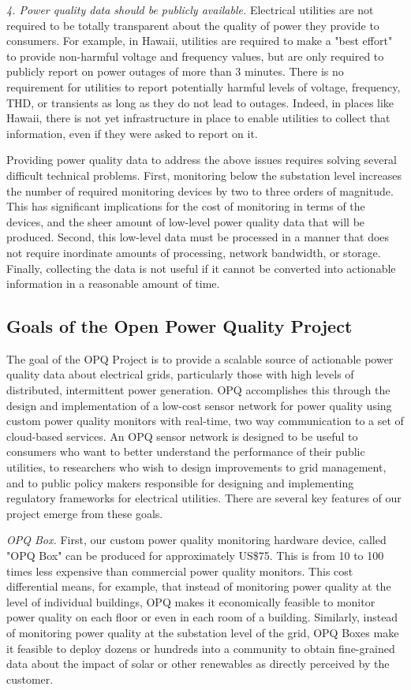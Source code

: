 {\em 4. Power quality data should be publicly available.} Electrical utilities are not required to be totally transparent about the quality of power they provide to consumers. For example, in Hawaii, utilities are required to make a "best effort" to provide non-harmful voltage and frequency values, but are only required to publicly report on power outages of more than 3 minutes. There is no requirement for utilities to report potentially harmful levels of voltage, frequency, THD, or transients as long as they do not lead to outages. Indeed, in places like Hawaii, there is not yet infrastructure in place to enable utilities to collect that information, even if they were asked to report on it.

Providing power quality data to address the above issues requires solving several difficult technical problems. First, monitoring below the substation level increases the number of required monitoring devices by two to three orders of magnitude. This has significant implications for the cost of monitoring in terms of the devices, and the sheer amount of low-level power quality data that will be produced. Second, this low-level data must be processed in a manner that does not require inordinate amounts of processing, network bandwidth, or storage. Finally, collecting the data is not useful if it cannot be converted into actionable information in a reasonable amount of time.

\subsection{Goals of the Open Power Quality Project}

The goal of the OPQ Project is to provide a scalable source of actionable power quality data about electrical grids, particularly those with high levels of distributed, intermittent power generation. OPQ accomplishes this through the design and implementation of a low-cost sensor network for power quality using custom power quality monitors with real-time, two way communication to a set of cloud-based services. An OPQ sensor network is designed to be useful to consumers who want to better understand the performance of their public utilities, to researchers who wish to design improvements to grid management, and to public policy makers responsible for designing and implementing regulatory frameworks for electrical utilities.  There are several key features of our project emerge from these goals.

{\em OPQ Box.} First, our custom power quality monitoring hardware device, called "OPQ Box" can be produced for approximately US\$75. This is from 10 to 100 times less expensive than commercial power quality monitors. This cost differential means, for example, that instead of monitoring power quality at the level of individual buildings, OPQ makes it economically feasible to monitor power quality on each floor or even in each room of a building. Similarly, instead of monitoring power quality at the substation level of the grid, OPQ Boxes make it feasible to deploy dozens or hundreds into a community to obtain fine-grained data about the impact of solar or other renewables as directly perceived by the customer.

